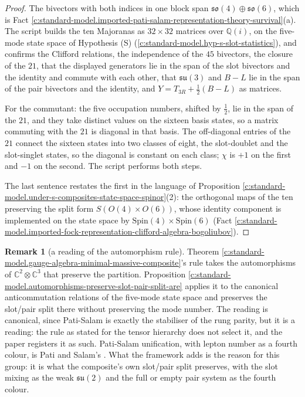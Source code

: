 \documentclass[11pt]{article}
\theoremstyle{definition}
\newtheorem{remark}[theorem]{Remark}
\theoremstyle{plain}
\providecommand{\C}{}\renewcommand{\C}{\mathbb{C}}
\providecommand{\su}{}\renewcommand{\su}{\mathfrak{su}}
\begin{document}
\begin{proof}
The bivectors with both indices in one block span $\mathfrak{so}(4) \oplus \mathfrak{so}(6)$, which is Fact \ref{c:standard-model.imported-pati-salam-representation-theory-survival}(a). The script builds the ten Majoranas as $32 \times 32$ matrices over $\mathbb{Q}(i)$, on the five-mode state space of Hypothesis (S) (\ref{c:standard-model.hyp-s-slot-statistics}), and confirms the Clifford relations, the independence of the $45$ bivectors, the closure of the $21$, that the displayed generators lie in the span of the slot bivectors and the identity and commute with each other, that $\su(3)$ and $B - L$ lie in the span of the pair bivectors and the identity, and $Y = T_{3R} + \tfrac12(B - L)$ as matrices.

For the commutant: the five occupation numbers, shifted by $\tfrac12$, lie in the span of the $21$, and they take distinct values on the sixteen basis states, so a matrix commuting with the $21$ is diagonal in that basis. The off-diagonal entries of the $21$ connect the sixteen states into two classes of eight, the slot-doublet and the slot-singlet states, so the diagonal is constant on each class; $\chi$ is $+1$ on the first and $-1$ on the second. The script performs both steps.

The last sentence restates the first in the language of Proposition \ref{c:standard-model.under-s-composites-state-space-spinor}(2): the orthogonal maps of the ten preserving the split form $S(O(4) \times O(6))$, whose identity component is implemented on the state space by $\mathrm{Spin}(4) \times \mathrm{Spin}(6)$ (Fact \ref{c:standard-model.imported-fock-representation-clifford-algebra-bogoliubov}).

\end{proof}

\begin{remark}[a reading of the automorphism rule]\label{c:note.standard-model.reading-automorphism-rule}
Theorem \ref{c:standard-model.gauge-algebra-minimal-massive-composite}'s rule takes the automorphisms of $\C^{2} \otimes \C^{3}$ that preserve the partition. Proposition \ref{c:standard-model.automorphisms-preserve-slot-pair-split-are} applies it to the canonical anticommutation relations of the five-mode state space and preserves the slot/pair split there without preserving the mode number. The reading is canonical, since Pati-Salam is exactly the stabiliser of the rung parity, but it is a reading: the rule as stated for the tensor hierarchy does not select it, and the paper registers it as such. Pati-Salam unification, with lepton number as a fourth colour, is Pati and Salam's \cite{PatiSalam1974}. What the framework adds is the reason for this group: it is what the composite's own slot/pair split preserves, with the slot mixing as the weak $\su(2)$ and the full or empty pair system as the fourth colour.
\end{remark}
\end{document}
